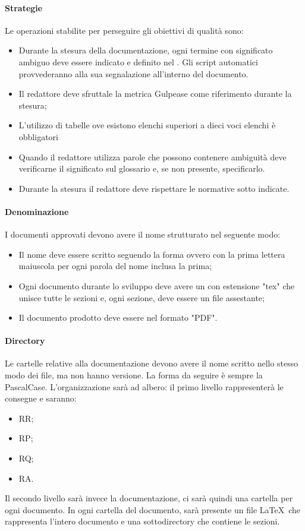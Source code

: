 \documentclass[../NormeDiProgetto_v4.0.0.tex]{subfiles}
\begin{document}
			\paragraph{Strategie}
				Le operazioni stabilite per perseguire gli obiettivi di qualità sono:
				\begin{itemize}
					\item Durante la stesura della documentazione, ogni termine con significato ambiguo deve essere indicato e definito nel \glossario. Gli script automatici provvederanno alla sua segnalazione all'interno del documento.
					\item Il redattore deve sfruttale la metrica Gulpease come riferimento durante la stesura;
					\item L'utilizzo di tabelle ove esistono elenchi superiori a dieci voci elenchi è obbligatori
					\item Quando il redattore utilizza parole che possono contenere ambiguità deve verificarne il significato sul glossario e, se non presente, specificarlo.
					\item Durante la stesura il redattore deve rispettare le normative sotto indicate. 
				\end{itemize}


			\paragraph{Denominazione}
				I documenti approvati devono avere il nome strutturato nel seguente modo:
				\begin{itemize}
				\item Il nome deve essere scritto seguendo la forma  ovvero con la prima lettera maiuscola per ogni parola del nome inclusa la prima;
				\item Ogni documento durante lo sviluppo deve avere un con estensione "tex" che unisce tutte le sezioni e, ogni sezione, deve essere un file assestante;
				\item Il documento prodotto deve essere nel formato "PDF".
				\end{itemize}

			\paragraph{Directory}
				Le cartelle relative alla documentazione devono avere il nome scritto nello stesso modo dei file, ma non hanno versione. La forma da seguire è sempre la PascalCase.
				L'organizzazione sarà ad albero: il primo livello rappresenterà le consegne e saranno:
				\begin{itemize}
				\item RR;
				\item RP;
				\item RQ;
				\item RA.				
				\end{itemize}
				Il secondo livello sarà invece la documentazione, ci sarà quindi una cartella per ogni documento.
				In ogni cartella del documento, sarà presente un file \LaTeX\ che rappresenta l'intero documento e una sottodirectory che contiene le sezioni.
\end{document}
